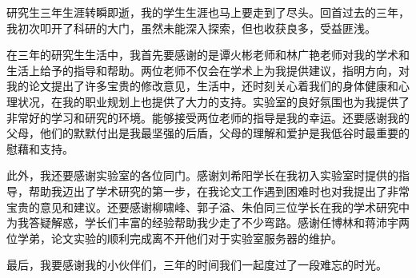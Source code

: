 \acknowledgments

研究生三年生涯转瞬即逝，我的学生生涯也马上要走到了尽头。回首过去的三年，我初次叩开了科研的大门，虽然未能深入探索，但也收获良多，受益匪浅。

在三年的研究生生活中，我首先要感谢的是谭火彬老师和林广艳老师对我的学术和生活上给予的指导和帮助。两位老师不仅会在学术上为我提供建议，指明方向，对我的论文提出了许多宝贵的修改意见，生活中，还时刻关心着我们的身体健康和心理状况，在我的职业规划上也提供了大力的支持。实验室的良好氛围也为我提供了非常好的学习和研究的环境。能够接受两位老师的指导是我的幸运。还要感谢我的父母，他们的默默付出是我最坚强的后盾，父母的理解和爱护是我低谷时最重要的慰藉和支持。

此外，我还要感谢实验室的各位同门。感谢刘希阳学长在我初入实验室时提供的指导，帮助我迈出了学术研究的第一步，在我论文工作遇到困难时也对我提出了非常宝贵的意见和建议。还要感谢柳啸峰、郭子溢、朱伯同三位学长在我的学术研究中为我答疑解惑，学长们丰富的经验帮助我少走了不少弯路。感谢任博林和蒋沛宇两位学弟，论文实验的顺利完成离不开他们对于实验室服务器的维护。

最后，我要感谢我的小伙伴们，三年的时间我们一起度过了一段难忘的时光。


